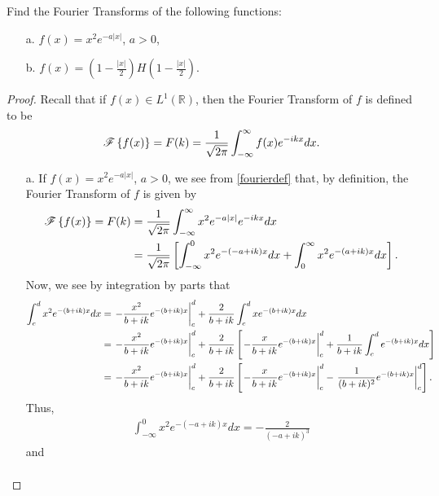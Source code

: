 \begin{problem}{1}
  Find the Fourier Transforms of the following functions:
  \begin{enumerate}
    \item[a.] $f(x) = x^2 e^{-a|x|}$, $a > 0$,
    \item[b.] $\displaystyle f(x) = \left(1 - \frac{|x|}{2}\right)H\left(1 - \frac{|x|}{2}\right)$.
  \end{enumerate}
\end{problem}

\begin{proof}
  Recall that if $f(x) \in L^1(\mathbb{R})$, then the Fourier Transform of $f$ is
  defined to be
  \begin{align}\label{fourierdef}
    \mathscr{F}\left\{ {f(x)} \right\} = F(k) = \frac{1}{\sqrt{2\pi}}\int_{-\infty}^\infty f(x) e^{-ikx} dx.
  \end{align}
  \begin{enumerate}
    \item[a.] If $f(x) = x^2 e^{-a|x|}$, $a > 0$, we see from \eqref{fourierdef}
      that, by definition, the Fourier Transform of $f$ is given by
      \begin{align*}
        \mathscr{F}\left\{ {f(x)} \right\} = F(k) &= \frac{1}{\sqrt{2\pi}}\int_{-\infty}^\infty x^2 e^{-a|x|} e^{-ikx} dx \\
        &= \frac{1}{\sqrt{2\pi}}\left[\int_{-\infty}^0 x^2 e^{-(-a+ik)x} dx + \int_{0}^\infty x^2 e^{-(a+ik)x} dx\right].
      \end{align*}
      Now, we see by integration by parts that
      \begin{align}\label{intform}
        \int_c^d x^2 e^{-(b+ik)x}dx
        &= \left.-\frac{x^2}{b+ik}e^{-(b+ik)x}\right\rvert_c^d + \frac{2}{b+ik}\int_c^d x e^{-(b+ik)x}dx \notag\\
        &= \left.-\frac{x^2}{b+ik}e^{-(b+ik)x}\right\rvert_c^d + \frac{2}{b+ik}\left[\left.-\frac{x}{b+ik}e^{-(b+ik)x}\right\rvert_c^d + \frac{1}{b+ik}\int_c^d e^{-(b+ik)x}dx\right]\notag\\
        &=\left.-\frac{x^2}{b+ik}e^{-(b+ik)x}\right\rvert_c^d + \frac{2}{b+ik}\left[\left.-\frac{x}{b+ik}e^{-(b+ik)x}\right\rvert_c^d - \left.\frac{1}{(b+ik)^2}e^{-(b+ik)x}\right\rvert_c^d\right].
      \end{align}
      Thus,
      \begin{align*}
        \int_{-\infty}^0 x^2 e^{-(-a+ik)x} dx = -\frac{2}{(-a+ik)^3}
      \end{align*}
      and
      \begin{align*}

\end{align*}
\end{enumerate}
\end{proof}
